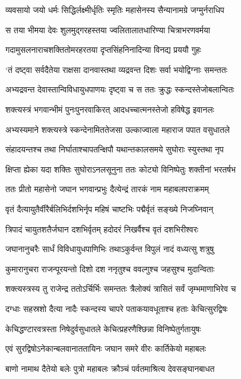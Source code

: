 \twolineshloka
{व्यवसायो जयो धर्मः सिद्धिर्लक्ष्मीर्धृतिः स्मृतिः}
{महासेनस्य सैन्यानामग्रे जग्मुर्नराधिप}


\twolineshloka
{स तया भीमया देवः शुलमुद्गरहस्तया}
{ज्वलितालातधारिण्या चित्राभरणवर्मया}


\twolineshloka
{गदामुसलनाराचशक्तितोमरहरतया}
{दृप्तसिंहनिनादिन्या विनद्य प्रययौ गुहः}


\twolineshloka
{`तं दष्ट्वा सर्वदैतेया राक्षसा दानवास्तथा}
{व्यद्रवन्त दिशः सर्वा भयोद्विग्नाः समन्ततः}


\twolineshloka
{अभ्यद्रवन्त देवास्तान्विविधायुधपाणयः}
{दृष्ट्वा च स ततः क्रुद्धः स्कन्दस्तेजोबलान्वितः}


\twolineshloka
{शक्त्यस्त्रं भगवान्भीमं पुनःपुनरवाकिरत्}
{आदधच्चात्मनस्तेजो हविषेद्ध इवानलः}


\twolineshloka
{अभ्यस्यमाने शक्त्यस्त्रे स्कन्देनामिततेजसा}
{उल्काज्वाला महाराज पपात वसुधातले}


\twolineshloka
{संहादयन्तश्च तथा निर्घाताश्चापतन्क्षिपौ}
{यथान्तकालसमये सुघोराः स्युस्तथा नृप}


\twolineshloka
{क्षिप्ता ह्येका यदा शक्तिः सुघोराऽनलसूनुना}
{ततः कोट्यो विनिष्पेतुः शक्तीनां भरतर्षभ}


\twolineshloka
{ततः प्रीतो महासेनो जघान भगवान्प्रभुः}
{दैत्येन्द्रं तारकं नाम महाबलपराक्रमम्}


\twolineshloka
{वृतं दैत्यायुतैर्वीरैर्बलिभिर्दशभिर्नृप}
{महिषं चाष्टभिः पद्मैर्वृतं सङ्ख्ये निजघ्निवान्}


\twolineshloka
{त्रिपादं चायुतशतैर्जघान दशभिर्वृतम्}
{हदोदरं निखर्वैश्च वृतं दशभिरीश्वरः}


\twolineshloka
{जघानानुचरैः सार्धं विविधायुधपाणिभिः}
{तथाऽकुर्वन्त विपुलं नादं वध्यत्सु शत्रुषु}


\twolineshloka
{कुमारानुचरा राजन्पूरयन्तो दिशो दश}
{ननृतुश्च ववल्गुश्च जहसुश्च मुदान्विताः}


\twolineshloka
{शक्त्यस्त्रस्य तु राजेन्द्र ततोऽर्चिर्भिः समन्ततः}
{त्रैलोक्यं त्रासितं सर्वं जृम्भमाणाभिरेव च}


\twolineshloka
{दग्धाः सहस्रशो दैत्या नादैः स्कन्दस्य चापरे}
{पताकयावधूताश्च हताः केचित्सुरद्विषः}


\twolineshloka
{केचिद्धण्टारवत्रस्ता निषेदुर्वसुधातले}
{केचित्प्रहरणैश्छिन्ना विनिष्पेतुर्गतायुषः}


\twolineshloka
{एवं सुरद्विषोऽनेकान्बलवानाततायिनः}
{जघान समरे वीरः कार्तिकेयो महाबलः}


\twolineshloka
{बाणो नामाथ दैतेयो बलेः पुत्रो महाबलः}
{क्रौञ्चं पर्वतमाश्रित्य देवसङ्घानबाधत}


